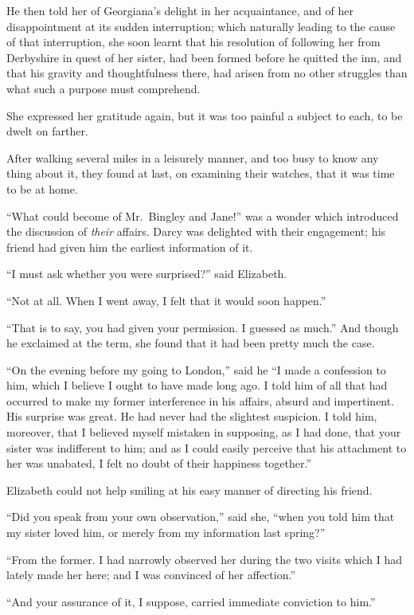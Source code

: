 He then told her of Georgiana’s delight in her acquaintance,
and of her disappointment at its sudden interruption;
which naturally leading to the cause of that
interruption, she soon learnt that his resolution of following
her from Derbyshire in quest of her sister, had been
formed before he quitted the inn, and that his gravity
and thoughtfulness there, had arisen from no other
struggles than what such a purpose must comprehend.

She expressed her gratitude again, but it was too
painful a subject to each, to be dwelt on farther.

After walking several miles in a leisurely manner, and
too busy to know any thing about it, they found at last, on
examining their watches, that it was time to be at home.

“What could become of Mr.\ Bingley and Jane!”
was a wonder which introduced the discussion of \textit{their}
affairs. Darcy was delighted with their engagement; his
friend had given him the earliest information of it.

“I must ask whether you were surprised?” said
Elizabeth.

“Not at all. When I went away, I felt that it would
soon happen.”

“That is to say, you had given your permission. I
guessed as much.” And though he exclaimed at the term,
she found that it had been pretty much the case.

“On the evening before my going to London,” said he
“I made a confession to him, which I believe I ought to
have made long ago. I told him of all that had occurred
to make my former interference in his affairs, absurd
and impertinent. His surprise was great. He had never
had the slightest suspicion. I told him, moreover, that
I believed myself mistaken in supposing, as I had done,
that your sister was indifferent to him; and as I could
easily perceive that his attachment to her was unabated,
I felt no doubt of their happiness together.”

Elizabeth could not help smiling at his easy manner of
directing his friend.

“Did you speak from your own observation,” said she,
“when you told him that my sister loved him, or merely
from my information last spring?”

“From the former. I had narrowly observed her during
the two visits which I had lately made her here; and
I was convinced of her affection.”

“And your assurance of it, I suppose, carried immediate
conviction to him.”

